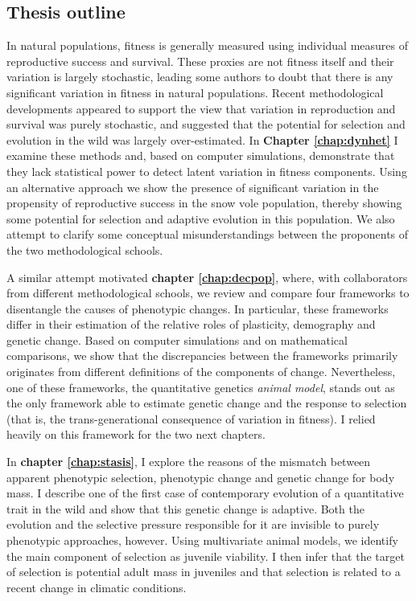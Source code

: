 \subsection{Thesis outline}

In natural populations, fitness is generally measured using individual measures of reproductive success and survival. These proxies are not fitness itself and their variation is largely stochastic, leading some authors to doubt that there is any significant variation in fitness in natural populations. Recent methodological developments appeared to support the view that variation in reproduction and survival was purely stochastic, and suggested that the potential for selection and evolution in the wild was largely over-estimated. In \textbf{Chapter \ref{chap:dynhet}} I examine these methods and, based on computer simulations, demonstrate that they lack statistical power to detect latent variation in fitness components. Using an alternative approach we show the presence of significant variation in the propensity of reproductive success in the snow vole population, thereby showing some potential for selection and adaptive evolution in this population. We also attempt to clarify some conceptual misunderstandings between the proponents of the two methodological schools. 

A similar attempt motivated \textbf{chapter \ref{chap:decpop}}, where, with collaborators from different methodological schools, we review and compare four frameworks to disentangle the causes of phenotypic changes. In particular, these frameworks differ in their estimation of the relative roles of plasticity, demography and genetic change. Based on computer simulations and on mathematical comparisons, we show that the discrepancies between the frameworks primarily originates from different definitions of the components of change. Nevertheless, one of these frameworks, the quantitative genetics \emph{animal model}, stands out as the only framework able to estimate genetic change and the response to selection (that is, the trans-generational consequence of variation in fitness). I relied heavily on this framework for the two next chapters.  

In \textbf{chapter \ref{chap:stasis}}, I explore the reasons of the mismatch between apparent phenotypic selection, phenotypic change and genetic change for body mass. I describe one of the first case of contemporary evolution of a quantitative trait in the wild and show that this genetic change is adaptive. Both the evolution and the selective pressure responsible for it are invisible to purely phenotypic approaches, however. Using multivariate animal models, we identify the main component of selection as juvenile viability. I then infer that the target of selection is potential adult mass in juveniles and that selection is related to a recent change in climatic conditions. 

